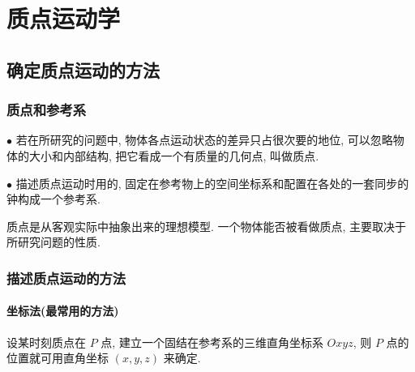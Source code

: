 \chapter{质点运动学}

\begin{introduction}
	\item {}
	\item {}
	\item {}
	\item {}
\end{introduction}

\section{确定质点运动的方法} \label{1.1}

\subsection{质点和参考系}

\begin{definition}[质点、参考系] \label{C1-df1}
	
	$\bullet$ 若在所研究的问题中, 物体各点运动状态的差异只占很次要的地位, 可以忽略物体的大小和内部结构, 把它看成一个{\heiti 有质量的几何点}, 叫做{\heiti 质点}. 
	
	$\bullet$ 描述质点运动时用的, 固定在{\heiti 参考物}上的{\heiti 空间坐标系}和配置在各处的一套同步的{\heiti 钟}构成一个{\heiti 参考系}. 
	
\end{definition}

\begin{note}
	
	质点是从客观实际中抽象出来的理想模型. 一个物体能否被看做质点, 主要取决于所研究问题的性质. 
	
\end{note}

\subsection{描述质点运动的方法}

\subsubsection{坐标法(最常用的方法)}

设某时刻质点在 $P$ 点, 建立一个固结在参考系的三维直角坐标系 $Oxyz$, 则 $P$ 点的位置就可用直角坐标 $(x, y, z)$ 来确定. 


